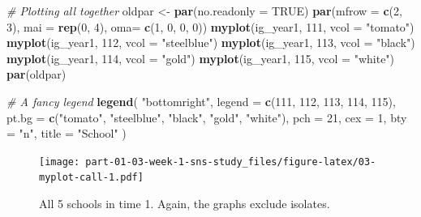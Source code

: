 \documentclass[]{book}
\newenvironment{Shaded}{\begin{snugshade}}{\end{snugshade}}
\newcommand{\CommentTok}[1]{\textcolor[rgb]{0.56,0.35,0.01}{\textit{#1}}}
\newcommand{\DataTypeTok}[1]{\textcolor[rgb]{0.13,0.29,0.53}{#1}}
\newcommand{\DecValTok}[1]{\textcolor[rgb]{0.00,0.00,0.81}{#1}}
\newcommand{\KeywordTok}[1]{\textcolor[rgb]{0.13,0.29,0.53}{\textbf{#1}}}
\newcommand{\NormalTok}[1]{#1}
\newcommand{\OtherTok}[1]{\textcolor[rgb]{0.56,0.35,0.01}{#1}}
\newcommand{\StringTok}[1]{\textcolor[rgb]{0.31,0.60,0.02}{#1}}
\begin{document}
\begin{Shaded}
\begin{Highlighting}[]
\CommentTok{# Plotting all together}
\NormalTok{oldpar <-}\StringTok{ }\KeywordTok{par}\NormalTok{(}\DataTypeTok{no.readonly =} \OtherTok{TRUE}\NormalTok{)}
\KeywordTok{par}\NormalTok{(}\DataTypeTok{mfrow =} \KeywordTok{c}\NormalTok{(}\DecValTok{2}\NormalTok{, }\DecValTok{3}\NormalTok{), }\DataTypeTok{mai =} \KeywordTok{rep}\NormalTok{(}\DecValTok{0}\NormalTok{, }\DecValTok{4}\NormalTok{), }\DataTypeTok{oma=} \KeywordTok{c}\NormalTok{(}\DecValTok{1}\NormalTok{, }\DecValTok{0}\NormalTok{, }\DecValTok{0}\NormalTok{, }\DecValTok{0}\NormalTok{))}
\KeywordTok{myplot}\NormalTok{(ig_year1, }\DecValTok{111}\NormalTok{, }\DataTypeTok{vcol =} \StringTok{"tomato"}\NormalTok{)}
\KeywordTok{myplot}\NormalTok{(ig_year1, }\DecValTok{112}\NormalTok{, }\DataTypeTok{vcol =} \StringTok{"steelblue"}\NormalTok{)}
\KeywordTok{myplot}\NormalTok{(ig_year1, }\DecValTok{113}\NormalTok{, }\DataTypeTok{vcol =} \StringTok{"black"}\NormalTok{)}
\KeywordTok{myplot}\NormalTok{(ig_year1, }\DecValTok{114}\NormalTok{, }\DataTypeTok{vcol =} \StringTok{"gold"}\NormalTok{)}
\KeywordTok{myplot}\NormalTok{(ig_year1, }\DecValTok{115}\NormalTok{, }\DataTypeTok{vcol =} \StringTok{"white"}\NormalTok{)}
\KeywordTok{par}\NormalTok{(oldpar)}

\CommentTok{# A fancy legend}
\KeywordTok{legend}\NormalTok{(}
  \StringTok{"bottomright"}\NormalTok{,}
  \DataTypeTok{legend =} \KeywordTok{c}\NormalTok{(}\DecValTok{111}\NormalTok{, }\DecValTok{112}\NormalTok{, }\DecValTok{113}\NormalTok{, }\DecValTok{114}\NormalTok{, }\DecValTok{115}\NormalTok{),}
  \DataTypeTok{pt.bg  =} \KeywordTok{c}\NormalTok{(}\StringTok{"tomato"}\NormalTok{, }\StringTok{"steelblue"}\NormalTok{, }\StringTok{"black"}\NormalTok{, }\StringTok{"gold"}\NormalTok{, }\StringTok{"white"}\NormalTok{),}
  \DataTypeTok{pch    =} \DecValTok{21}\NormalTok{,}
  \DataTypeTok{cex    =} \DecValTok{1}\NormalTok{,}
  \DataTypeTok{bty    =} \StringTok{"n"}\NormalTok{,}
  \DataTypeTok{title  =} \StringTok{"School"}
\NormalTok{  )}
\end{Highlighting}
\end{Shaded}

\begin{figure}
\centering
\texttt{[image: part-01-03-week-1-sns-study\_files/figure-latex/03-myplot-call-1.pdf]}
\caption{\label{fig:03-myplot-call}All 5 schools in time 1. Again, the graphs exclude isolates.}
\end{figure}
\end{document}
